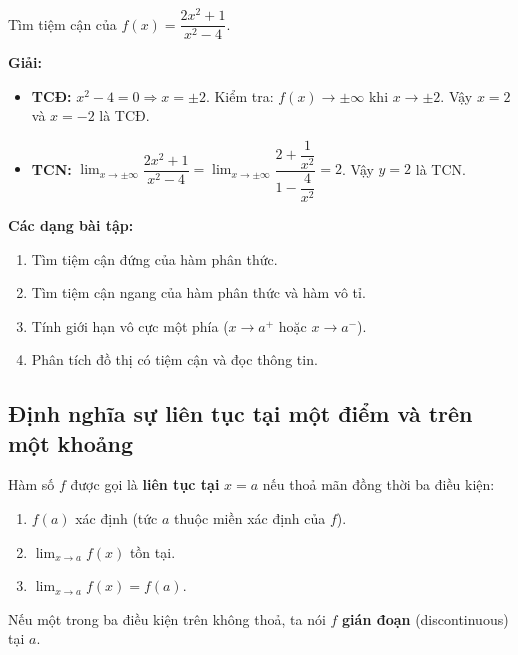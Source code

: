 \documentclass[12pt,a4paper]{article}
\begin{document}
\begin{vidu}
  Tìm tiệm cận của $f(x) = \dfrac{2x^2 + 1}{x^2 - 4}$.

  \medskip\textbf{Giải:}
  \begin{itemize}
    \item \textbf{TCĐ:} $x^2 - 4 = 0 \Rightarrow x = \pm 2$. Kiểm tra: $f(x) \to \pm\infty$ khi $x \to \pm 2$. Vậy $x = 2$ và $x = -2$ là TCĐ.
    \item \textbf{TCN:} $\displaystyle\lim_{x \to \pm\infty} \dfrac{2x^2 + 1}{x^2 - 4} = \lim_{x \to \pm\infty} \dfrac{2 + \dfrac{1}{x^2}}{1 - \dfrac{4}{x^2}} = 2$. Vậy $y = 2$ là TCN.
  \end{itemize}
\end{vidu}

\medskip\noindent\textbf{Các dạng bài tập:}
\begin{enumerate}[label=\textbf{Dạng \arabic*:}, leftmargin=*, align=left]
  \item Tìm tiệm cận đứng của hàm phân thức.
  \item Tìm tiệm cận ngang của hàm phân thức và hàm vô tỉ.
  \item Tính giới hạn vô cực một phía ($x \to a^+$ hoặc $x \to a^-$).
  \item Phân tích đồ thị có tiệm cận và đọc thông tin.
\end{enumerate}

\subsection{Định nghĩa sự liên tục tại một điểm và trên một khoảng}

\begin{dinhnghia}[title={Hàm số liên tục tại một điểm}]
  Hàm số $f$ được gọi là \textbf{liên tục tại} $x = a$ nếu thoả mãn đồng thời ba điều kiện:
  \begin{enumerate}
    \item $f(a)$ xác định (tức $a$ thuộc miền xác định của $f$).
    \item $\displaystyle\lim_{x \to a} f(x)$ tồn tại.
    \item $\displaystyle\lim_{x \to a} f(x) = f(a)$.
  \end{enumerate}
  Nếu một trong ba điều kiện trên không thoả, ta nói $f$ \textbf{gián đoạn} (discontinuous) tại $a$.
\end{dinhnghia}
\end{document}
